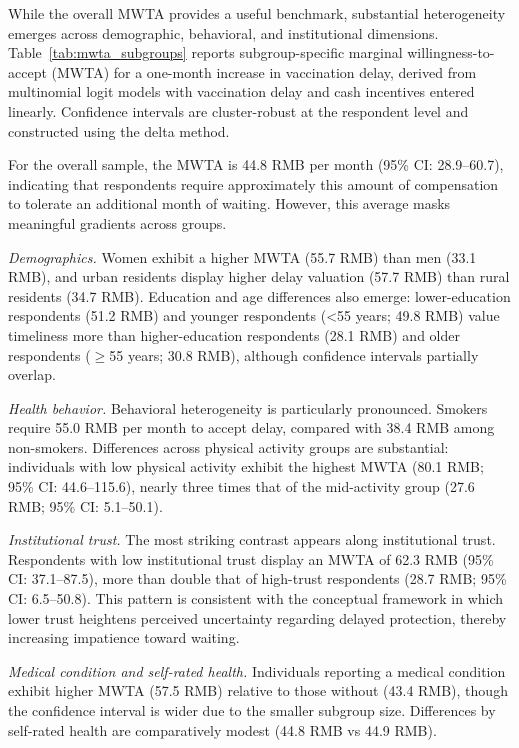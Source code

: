\documentclass[doublespacing]{utdthesis}
\begin{document}
While the overall MWTA provides a useful benchmark, substantial heterogeneity emerges across demographic, behavioral, and institutional dimensions. Table~\ref{tab:mwta_subgroups} reports subgroup-specific marginal willingness-to-accept (MWTA) for a one-month increase in vaccination delay, derived from multinomial logit models with vaccination delay and cash incentives entered linearly. Confidence intervals are cluster-robust at the respondent level and constructed using the delta method.

For the overall sample, the MWTA is 44.8 RMB per month (95\% CI: 28.9--60.7), indicating that respondents require approximately this amount of compensation to tolerate an additional month of waiting. However, this average masks meaningful gradients across groups.

\textit{Demographics.} Women exhibit a higher MWTA (55.7 RMB) than men (33.1 RMB), and urban residents display higher delay valuation (57.7 RMB) than rural residents (34.7 RMB). Education and age differences also emerge: lower-education respondents (51.2 RMB) and younger respondents (<55 years; 49.8 RMB) value timeliness more than higher-education respondents (28.1 RMB) and older respondents ($\geq$55 years; 30.8 RMB), although confidence intervals partially overlap.

\textit{Health behavior.} Behavioral heterogeneity is particularly pronounced. Smokers require 55.0 RMB per month to accept delay, compared with 38.4 RMB among non-smokers. Differences across physical activity groups are substantial: individuals with low physical activity exhibit the highest MWTA (80.1 RMB; 95\% CI: 44.6--115.6), nearly three times that of the mid-activity group (27.6 RMB; 95\% CI: 5.1--50.1).

\textit{Institutional trust.} The most striking contrast appears along institutional trust. Respondents with low institutional trust display an MWTA of 62.3 RMB (95\% CI: 37.1--87.5), more than double that of high-trust respondents (28.7 RMB; 95\% CI: 6.5--50.8). This pattern is consistent with the conceptual framework in which lower trust heightens perceived uncertainty regarding delayed protection, thereby increasing impatience toward waiting.

\textit{Medical condition and self-rated health.} Individuals reporting a medical condition exhibit higher MWTA (57.5 RMB) relative to those without (43.4 RMB), though the confidence interval is wider due to the smaller subgroup size. Differences by self-rated health are comparatively modest (44.8 RMB vs 44.9 RMB).
\end{document}
